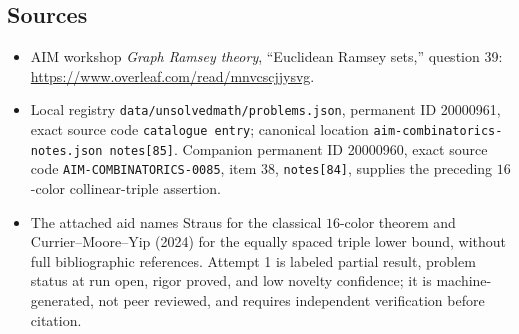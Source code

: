 \documentclass[11pt]{article}
\begin{document}
\subsection{Sources}
\begin{itemize}
\item AIM workshop \emph{Graph Ramsey theory}, ``Euclidean Ramsey sets,'' question 39: \url{https://www.overleaf.com/read/mnvcscjjysvg}.
\item Local registry \texttt{data/unsolvedmath/problems.json}, permanent ID 20000961, exact source code \texttt{catalogue entry}; canonical location \texttt{aim-combinatorics-notes.json notes[85]}. Companion permanent ID 20000960, exact source code \texttt{AIM-COMBINATORICS-0085}, item 38, \texttt{notes[84]}, supplies the preceding $16$-color collinear-triple assertion.
\item The attached aid names Straus for the classical $16$-color theorem and Currier--Moore--Yip (2024) for the equally spaced triple lower bound, without full bibliographic references. Attempt 1 is labeled partial result, problem status at run open, rigor proved, and low novelty confidence; it is machine-generated, not peer reviewed, and requires independent verification before citation.
\end{itemize}
\end{document}
